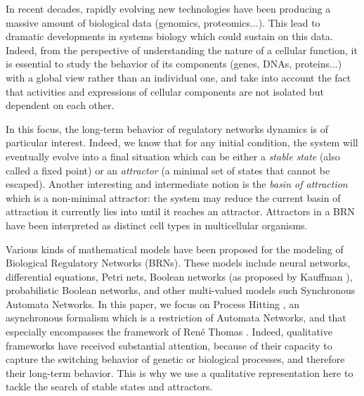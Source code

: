 

In recent decades, rapidly evolving new technologies have been producing a massive amount of biological data (genomics, proteomics...). This lead to dramatic developments in systems biology which could sustain on this data. Indeed, from the perspective of understanding the nature of a cellular function, it is essential to study the behavior of its components (genes, DNAs, proteins...) with a global view rather than an individual one, and take into account the fact that activities and expressions of cellular components are not isolated but dependent on each other.

In this focus, the long-term behavior of regulatory networks dynamics is of particular interest. Indeed, we know that  for any initial condition, the system will eventually evolve into a final situation which can be either a \emph{stable state} (also called a fixed point) or an \emph{attractor} (a minimal set of states that cannot be escaped). Another interesting and intermediate notion is the \emph{basin of attraction} which is a non-minimal attractor: the system may reduce the current basin of attraction it currently lies into until it reaches an attractor.
Attractors in a BRN have been interpreted as distinct cell types in multicellular organisms. 

Various kinds of mathematical models have been proposed for the modeling of Biological Regulatory Networks (BRNs). These models include neural networks, differential equations, Petri nets, Boolean networks (as proposed by Kauffman ), probabilistic Boolean networks, and other multi-valued models such Synchronous Automata Networks. In this paper, we focus on Process Hitting , an asynchronous formalism which is a restriction of Automata Networks, and that especially encompasses the framework of René Thomas . Indeed, qualitative frameworks have received substantial attention, because of their capacity to capture the switching behavior of genetic or biological processes, and therefore their long-term behavior. This is why we use a qualitative representation here to tackle the search of stable states and attractors.

